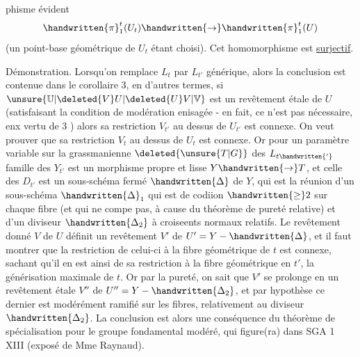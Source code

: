 phisme évident
\[
\handwritten{\pi}_1^t(U_t)\handwritten{\rightarrow}\handwritten{\pi}_1^t(U)
\]
(un point-base géométrique de $U_t$ étant choisi). Cet homomorphisme est \uline{surjectif}.

Démonstration. Lorsqu'on remplace $L_t$ par $L_{t'}$ générique, alors la conclusion est contenue dans le corollaire 3, en d'autres termes, si $\unsure{\mathbb{U}|\deleted{V}U|\deleted{U}V|\mathbb{V}}$ est un revêtement étale  de $U$  (satisfaisant la condition de modération enisagée - en fait, ce n'est pas nécessaire, enx vertu de 3 ) alors sa restriction $V_{t'}$ au dessus de $U_{t'}$ est connexe. On veut prouver que sa restriction $V_t$ au dessus de $U_t$ est  connexe. Or pour un paramètre variable sur  la grassmanienne $\deleted{\unsure{T|G}}$ des $L_{t\handwritten{'}}$\handwritten{,}   famille des $Y_{t'}$ est un morphisme propre et lisse $Y\handwritten{\rightarrow}T$, et celle des $D_{t'}$ est un sous-schéma fermé  $\handwritten{\Delta}$ de $Y$, qui est la réunion d'un sous-schéma $\handwritten{\Delta}_1$ qui est de codiion $\handwritten{\geq}2$ sur chaque fibre (et qui ne compe pas, à cause du théorème de pureté relative) et d'un diviseur $\handwritten{\Delta_2}$ à croiseents normaux relatifs. Le revêtement donné $V$ de $U$ définit un revêtement  $V'$ de $U'=Y-\handwritten{\Delta}$, et il faut montrer que la restriction de celui-ci à la fibre géométrique de $t$ est connexe, sachant qu'il en est ainsi de sa restriction à la fibre géométrique en $t'$, la générisation maximale de $t$. Or par la pureté, on sait que $V'$ se prolonge en un revêtement étale $V''$ de $U''=Y-\handwritten{\Delta_2}$, et par hypothèse ce dernier est modérément ramifié sur les fibres, relativement au diviseur $\handwritten{\Delta_2}$. La conclusion est alors une conséquence du théorème  de spécialisation pour le groupe fondamental modéré, qui figure(ra) dans SGA 1 XIII (exposé de Mme Raynaud).

